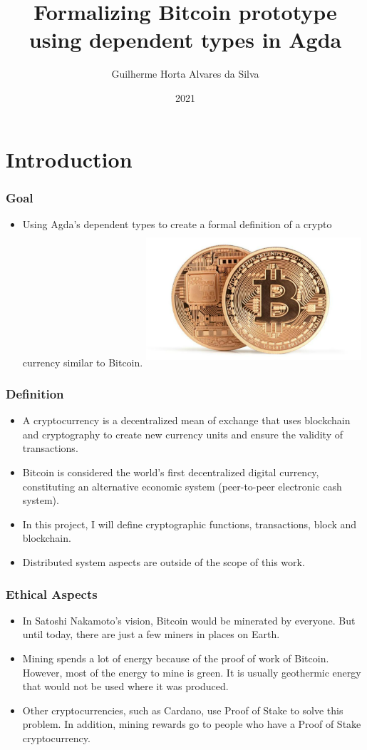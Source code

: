 \documentclass{beamer}
\title{Formalizing Bitcoin prototype \\
  using dependent types in Agda }
\author[Guilherme H. A. Silva]{Guilherme Horta Alvares da Silva}
\date{2021}
\begin{document}
\frame{\titlepage}

\section{Introduction}

\begin{frame}
\frametitle{Goal}
\begin{itemize}
  \item Using Agda's dependent types to create a formal definition of a crypto currency similar to Bitcoin.
    \includegraphics[width=8cm, height=5cm]{TwoBitcoins}
\end{itemize}
\end{frame}

\begin{frame}
   \frametitle{Definition}
\begin{itemize}
     \item A cryptocurrency is a decentralized mean of exchange that uses
       blockchain and cryptography to create new currency units and ensure the validity of transactions.
     \item Bitcoin is considered the world's first decentralized digital currency,
       constituting an alternative economic system (peer-to-peer electronic cash system).
     \item In this project, I will define cryptographic functions, transactions, block and blockchain.
     \item Distributed system aspects are outside of the scope of this work.
     \end{itemize}
\end{frame}

\begin{frame}
   \frametitle{Ethical Aspects}
\begin{itemize}
  \item In Satoshi Nakamoto's vision, Bitcoin would be minerated by everyone.
    But until today, there are just a few miners in places on Earth.
  \item Mining spends a lot of energy because of the proof of work of Bitcoin.
    However, most of the energy to mine is green. It is usually geothermic energy that would not be used where it was produced.
  \item Other cryptocurrencies, such as Cardano, use Proof of Stake to solve this problem. In addition, mining rewards go to people who have a Proof of Stake cryptocurrency.
\end{itemize}
\end{frame}
\end{document}

